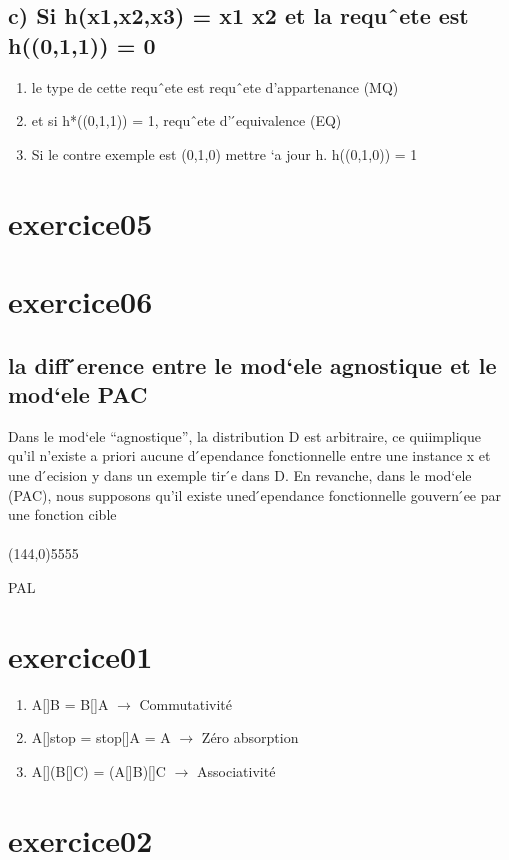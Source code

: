 \documentclass{article}
\begin{document}
    \subsection*{c) Si h(x1,x2,x3) = x1 x2 et la requˆete est h((0,1,1)) =
    0}
    \begin{enumerate}
        \item le type de cette requˆete est requˆete d’appartenance (MQ)
        \item et si h*((0,1,1)) = 1, requˆete d’ ́equivalence (EQ)
        \item Si le contre exemple est (0,1,0) mettre `a jour h. h((0,1,0)) = 1

    \end{enumerate}
\section*{exercice05}
\section*{exercice06}
    \subsection*{la diff ́erence entre le mod`ele agnostique et le mod`ele
    PAC}
    Dans le mod`ele “agnostique”, la distribution D est arbitraire, ce quiimplique
    qu’il n’existe a priori aucune d ́ependance fonctionnelle entre une instance x
    et une d ́ecision y dans un exemple tir ́e dans D. En revanche, dans le mod`ele
    (PAC), nous supposons qu’il existe uned ́ependance fonctionnelle gouvern ́ee
    par une fonction cible\\
    \\
    \line(144,0){5555}
\begin{center}
   \huge PAL
\end{center}

    \section*{exercice01}
    \begin{enumerate}
    \item  A[]B = B[]A $\to$ Commutativité
        \item A[]stop = stop[]A = A $\to$ Zéro absorption
    \item  A[](B[]C) = (A[]B)[]C $\to$ Associativité 
        \end{enumerate}
\section*{exercice02}
\end{document}
